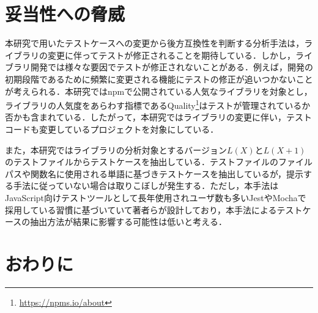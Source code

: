 \documentclass[submit]{ipsj}
\begin{document}
{%
\section{妥当性への脅威}\label{sec:validity}


本研究で用いたテストケースへの変更から後方互換性を判断する分析手法は，ライブラリの変更に伴ってテストが修正されることを期待している．しかし，ライブラリ開発では様々な要因でテストが修正されないことがある．例えば，開発の初期段階であるために頻繁に変更される機能にテストの修正が追いつかないことが考えられる．本研究ではnpmで公開されている人気なライブラリを対象とし，ライブラリの人気度をあらわす指標であるQuality\footnote{\url{https://npms.io/about}}はテストが管理されているか否かも含まれている．したがって，本研究ではライブラリの変更に伴い，テストコードも変更しているプロジェクトを対象にしている．

また，本研究ではライブラリの分析対象とするバージョン$L(X)$と$L(X+1)$のテストファイルからテストケースを抽出している．テストファイルのファイルパスや関数名に使用される単語に基づきテストケースを抽出しているが，提示する手法に従っていない場合は取りこぼしが発生する．ただし，本手法はJavaScript向けテストツールとして長年使用されユーザ数も多いJestやMochaで採用している習慣に基づいていて著者らが設計しており，本手法によるテストケースの抽出方法が結果に影響する可能性は低いと考える．

\section{おわりに}
\label{sec:conclusion}

}
\end{document}
